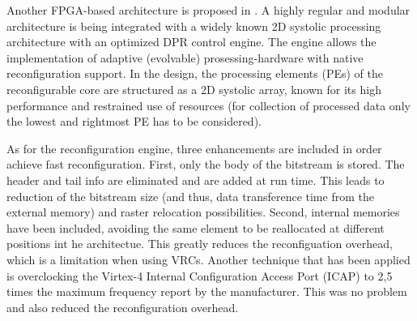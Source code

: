 
Another FPGA-based architecture is proposed in \cite{dpr}. A highly regular and modular architecture is being integrated with a widely known 2D systolic processing architecture with an optimized DPR control engine. The engine allows the implementation of adaptive (evolvable) prosessing-hardware with native reconfiguration support. In the design, the processing elements (PEs) of the reconfigurable core are structured as a 2D systolic array, known for its high performance and restrained use of resources (for collection of processed data only the lowest and rightmost PE has to be considered).

As for the reconfiguration engine, three enhancements are included in order achieve fast reconfiguration. First, only the body of the bitstream is stored. The header and tail info are eliminated and are added at run time. This leads to reduction of the bitstream size (and thus, data transference time from the external memory) and raster relocation possibilities. Second, internal memories have been included, avoiding  the same element to be reallocated at different positions int he architectue. This greatly reduces the reconfiguation overhead, which is a limitation when using VRCs. Another technique that has been applied is overclocking the Virtex-4 Internal Configuration Access Port (ICAP) to 2,5 times the maximum frequency report by the manufacturer. This was no problem and also reduced the reconfiguration overhead.
